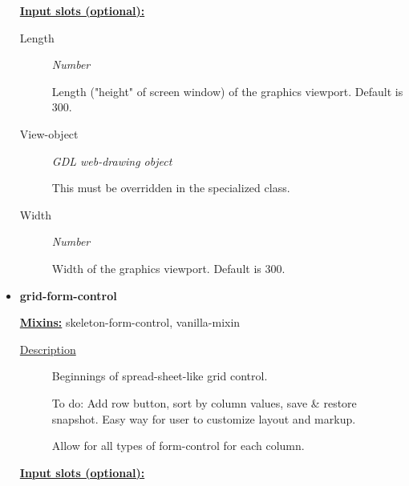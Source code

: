 \documentclass [11pt]{book}
\begin{document}
\begin{itemize}
\textbf{
\underline{Input slots (optional):}}

\begin{description}

\item [Length]
\emph{Number}

 Length ("height" of screen window) of the graphics viewport. Default is 300.




\item [View-object]
\emph{GDL web-drawing object}

 This must be overridden in the specialized class.




\item [Width]
\emph{Number}

 Width of the graphics viewport. Default is 300.




\end{description}







\item {}
\label{prim:grid-form-control}
\textbf{grid-form-control}


\textbf{
\underline{Mixins:}} skeleton-form-control, vanilla-mixin





\begin{description}

\item [
\underline{Description}]


Beginnings of spread-sheet-like 
grid control.

To do: Add row button, sort by column values, 
save \& restore snapshot. Easy way for user to 
customize layout and markup.

Allow for all types of form-control for each column.





\end{description}








\textbf{
\underline{Input slots (optional):}}


\end{itemize}
\end{document}
